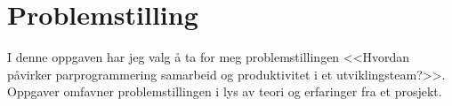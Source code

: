 \section{Problemstilling}


I denne oppgaven har jeg valg å ta for meg problemstillingen <<Hvordan påvirker parprogrammering samarbeid og produktivitet i et utviklingsteam?>>.
Oppgaver omfavner problemstillingen i lys av teori og erfaringer fra et prosjekt.
